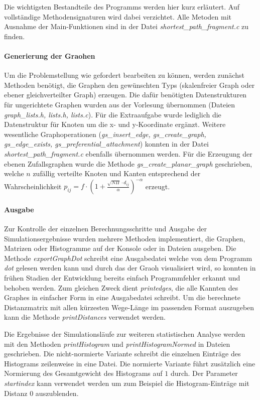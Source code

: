 \documentclass[10pt]{article}
\begin{document}
Die wichtigsten Bestandteile des Programms werden hier kurz erläutert. Auf vollständige Methodensignaturen wird dabei verzichtet. Alle Metoden mit Ausnahme der Main-Funktionen sind in der Datei \textit{shortest\_path\_fragment.c} zu finden.

\paragraph{Generierung der Graohen}
Um die Problemstellung wie gefordert bearbeiten zu können, werden zunächst Methoden benötigt, die Graphen den gewünschten Typs (skalenfreier Graph oder ebener gleichverteilter Graph) erzeugen. Die dafür benötigten Datenstrukturen für ungerichtete Graphen wurden aus der Vorlesung übernommen (Dateien \textit{graph\_lists.h, lists.h, lists.c}). Für die Extraaufgabe wurde lediglich die Datenstruktur für Knoten um die x- und y-Koordinate ergänzt. Weitere wesentliche Graphoperationen (\textit{gs\_insert\_edge, gs\_create\_graph, gs\_edge\_exists, gs\_preferential\_attachment}) konnten in der Datei \textit{shortest\_path\_fragment.c} ebenfalls übernommen werden. Für die Erzeugung der ebenen Zufallsgraphen wurde die Methode \textit{gs\_create\_planar\_graph} geschrieben, welche $n$ zufällig verteilte Knoten und Kanten entsprechend der Wahrscheinlichkeit $p_{ij} = f \cdot (1 + \frac{\sqrt{N \Pi} \cdot d_{ij}}{\alpha})^{-\alpha}$ erzeugt.

\paragraph{Ausgabe}
Zur Kontrolle der einzelnen Berechnungsschritte und Ausgabe der Simulationsergebnisse wurden mehrere Methoden implementiert, die Graphen, Matrizen oder Histogramme auf der Konsole oder in Dateien ausgeben. Die Methode \textit{exportGraphDot} schreibt eine Ausgabedatei welche von dem Programm \textit{dot} gelesen werden kann und durch das der Graoh visualisiert wird, so konnten in frühen Stadien der Entwicklung bereits einfach Programmfehler erkannt und behoben werden. Zum gleichen Zweck dient \textit{printedges}, die alle Kannten des Graphes in einfacher Form in eine Ausgabedatei schreibt. Um die berechnete Distanzmatrix mit allen kürzesten Wege-Länge im passenden Format auszugeben kann die Methode \textit{printDistances} verwendet werden.

Die Ergebnisse der Simulationsläufe zur weiteren statistischen Analyse werden mit den Methoden \textit{printHistogram} und \textit{printHistogramNormed} in Dateien geschrieben. Die nicht-normierte Variante schreibt die einzelnen Einträge des Histograms zeilenweise in eine Datei. Die normierte Variante führt zusätzlich eine Normierung des Gesamtgewicht des Histograms auf $1$ durch. Der Parameter \textit{startindex} kann verwendet werden um zum Beispiel die Histogram-Einträge mit Distanz 0 auszublenden.
\end{document}
